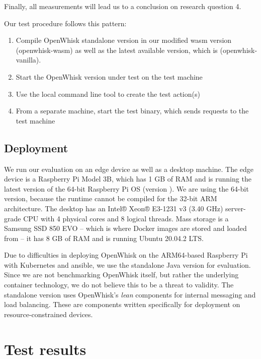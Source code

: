 Finally, all measurements will lead us to a conclusion on research question 4.

Our test procedure follows this pattern:

\begin{enumerate}
    \item Compile OpenWhisk standalone version in our modified wasm version (openwhisk-wasm) as well as the latest available version, which is  (openwhisk-vanilla).
    \item Start the OpenWhisk version under test on the test machine
    \item Use the local  command line tool to create the test action(s)
    \item From a separate machine, start the test binary, which sends requests to the test machine
\end{enumerate}

\subsection{Deployment}

We run our evaluation on an edge device as well as a  desktop machine. The edge device is a Raspberry Pi Model 3B, which has 1 GB of RAM and is running the latest version of the 64-bit Raspberry Pi OS (version ). We are using the 64-bit version, because the  runtime cannot be compiled for the 32-bit ARM architecture. The desktop has an Intel® Xeon® E3-1231 v3 (3.40 GHz) server-grade CPU with 4 physical cores and 8 logical threads. Mass storage is a Samsung SSD 850 EVO -- which is where Docker images are stored and loaded from -- it has 8 GB of RAM and is running Ubuntu 20.04.2 LTS.

Due to difficulties in deploying OpenWhisk on the ARM64-based Raspberry Pi with Kubernetes and ansible, we use the standalone Java version for evaluation. Since we are not benchmarking OpenWhisk itself, but rather the underlying container technology, we do not believe this to be a threat to validity. The standalone version uses OpenWhisk's \emph{lean} components for internal messaging and load balancing. These are components written specifically for deployment on resource-constrained devices.

\section{Test results}

